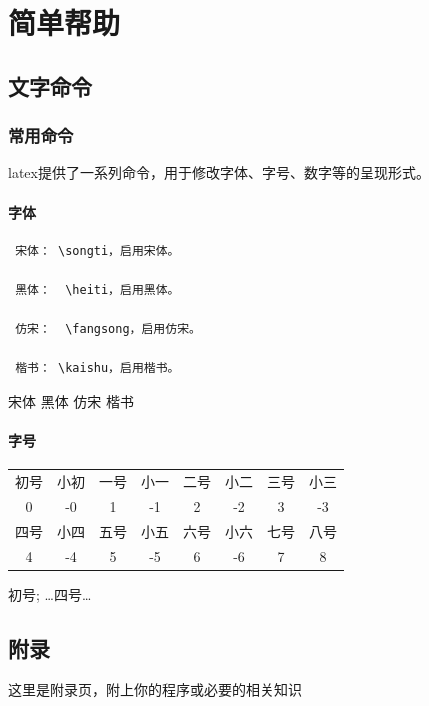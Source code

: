 \documentclass{LZUthesis}
\begin{document}
\chapter{简单帮助}
\section{文字命令}
 \subsection{常用命令}
 latex提供了一系列命令，用于修改字体、字号、数字等的呈现形式。
\subsubsection{字体}
\begin{verbatim}
 宋体： \songti，启用宋体。

 黑体：  \heiti，启用黑体。

 仿宋：  \fangsong，启用仿宋。

 楷书： \kaishu，启用楷书。

\end{verbatim}
 {\songti 宋体} {\heiti 黑体}    {\fangsong 仿宋}     {\kaishu 楷书}
 
\subsubsection{字号}

\begin{center}
 \begin{tabular}{cccccccc}
 \toprule
 初号 & 小初 & 一号 & 小一 & 二号 & 小二 & 三号 & 小三 \\
 0 & -0 & 1 & -1 & 2 & -2 & 3 & -3 \\
 \hline
 四号 & 小四 & 五号 & 小五 & 六号 & 小六 & 七号 & 八号 \\
 4 & -4 & 5 & -5 & 6 & -6 & 7 & 8 \\
 \bottomrule
 \end{tabular}
 \end{center}
{初号}; \dots {四号}\dots {}


\backmatter


\printbib




\Appendix

\section{附录}这里是附录页，附上你的程序或必要的相关知识\cite{lamport1994latexa}
\end{document}
